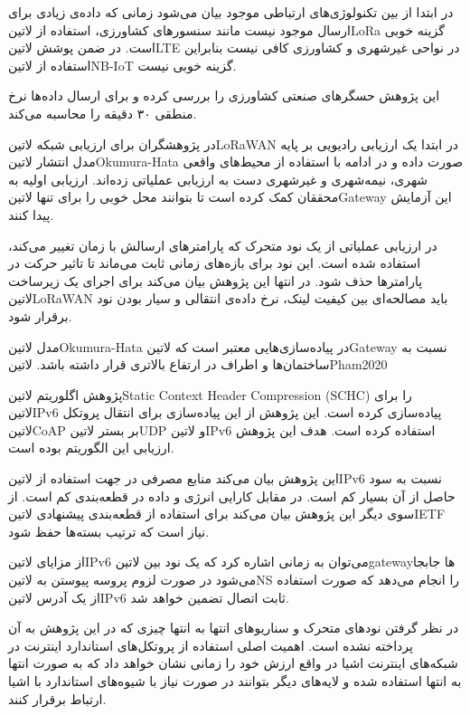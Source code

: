 در ابتدا از بین تکنولوژی‌های ارتباطی موجود بیان می‌شود زمانی که داده‌ی زیادی برای ارسال موجود نیست مانند سنسورهای کشاورزی، استفاده از ‌لاتین{LoRa} گزینه خوبی است.
در ضمن پوشش ‌لاتین{LTE} در نواحی غیرشهری و کشاورزی کافی نیست بنابراین استفاده از ‌لاتین{NB-IoT} گزینه خوبی نیست.

این پژوهش حسگرهای صنعتی کشاورزی را بررسی کرده و برای ارسال داده‌ها نرخ منطقی ۳۰ دقیقه را محاسبه می‌کند.


در  پژوهشگران برای ارزیابی شبکه ‌لاتین{LoRaWAN} در ابتدا یک ارزیابی رادیویی بر پایه مدل انتشار ‌لاتین{Okumura-Hata} صورت داده
و در ادامه با استفاده از محیط‌های واقعی شهری، نیمه‌شهری و غیرشهری دست به ارزیابی عملیاتی زده‌اند. ارزیابی اولیه به محققان کمک کرده است تا بتوانند محل خوبی را برای
تنها ‌لاتین{Gateway} این آزمایش پیدا کنند.

در ارزیابی عملیاتی از یک نود متحرک که پارامترهای ارسالش با زمان تغییر می‌کند، استفاده شده است. این نود برای بازه‌های زمانی ثابت می‌ماند تا تاثیر حرکت در پارامترها حذف شود.
در انتها این پژوهش بیان می‌کند برای اجرای یک زیرساخت ‌لاتین{LoRaWAN} باید مصالحه‌ای بین کیفیت لینک، نرخ داده‌ی انتقالی و سیار بودن نود برقرار شود.

مدل ‌لاتین{Okumura-Hata} در پیاده‌سازی‌هایی معتبر است که ‌لاتین{Gateway} نسبت به ساختمان‌ها و اطراف در ارتفاع بالاتری قرار داشته باشد.
‌لاتین{Pham2020}


پژوهش 
اگلوریتم ‌لاتین{Static Context Header Compression (SCHC)} را برای ‌لاتین{IPv6} پیاده‌سازی کرده است.
این پژوهش از این پیاده‌سازی برای انتقال پروتکل ‌لاتین{CoAP} بر بستر ‌لاتین{UDP} و ‌لاتین{IPv6} استفاده کرده است.
هدف این پژوهش ارزیابی این الگوریتم بوده است.

این پژوهش بیان می‌کند منابع مصرفی در جهت استفاده از ‌لاتین{IPv6} نسبت به سود حاصل از آن بسیار کم است. در مقابل کارایی انرژی و داده در قطعه‌بندی کم است.
از سوی دیگر این پژوهش بیان می‌کند برای استفاده از قطعه‌بندی پیشنهادی ‌لاتین{IETF} نیاز است که ترتیب بسته‌ها حفظ شود.

از مزایای ‌لاتین{IPv6} می‌توان به زمانی اشاره کرد که یک نود بین ‌لاتین{gateway}ها جابجا می‌شود در صورت لزوم پروسه پیوستن به ‌لاتین{NS} را انجام می‌دهد که صورت استفاده از یک آدرس ‌لاتین{IPv6} ثابت اتصال تضمین خواهد شد.

در نظر گرفتن نودهای متحرک و سناریوهای انتها به انتها چیزی که در این پژوهش به آن پرداخته نشده است. اهمیت اصلی استفاده از پروتکل‌های استاندارد اینترنت در شبکه‌های اینترنت اشیا
در واقع ارزش خود را زمانی نشان خواهد داد که به صورت انتها به انتها استفاده شده و لایه‌های دیگر بتوانند در صورت نیاز با شیوه‌های استاندارد با اشیا ارتباط برقرار کنند.


